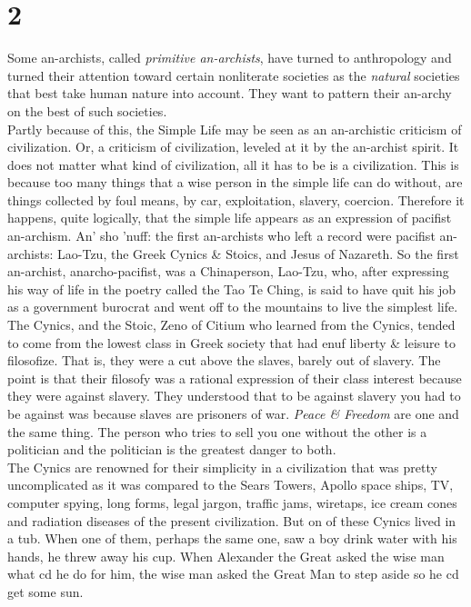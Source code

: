 \section*{2}
Some an-archists, called \emph{primitive an-archists}, have turned to anthropology and turned their attention toward certain nonliterate societies as the \emph{natural} societies that best take human nature into account. They want to pattern their an-archy on the best of such societies.\\
Partly because of this, the Simple Life may be seen as an an-archistic criticism of civilization. Or, a criticism of civilization, leveled at it by the an-archist spirit. It does not matter what kind of civilization, all it has to be is a civilization. This is because too many things that a wise person in the simple life can do without, are things collected by foul means, by car, exploitation, slavery, coercion. Therefore it happens, quite logically, that the simple life appears as an expression of pacifist an-archism. An' sho 'nuff: the first an-archists who left a record were pacifist an-archists: Lao-Tzu, the Greek Cynics \& Stoics, and Jesus of Nazareth. So the first an-archist, anarcho-pacifist, was a Chinaperson, Lao-Tzu, who, after expressing his way of life in the poetry called the Tao Te Ching, is said to have quit his job as a government burocrat and went off to the mountains to live the simplest life.\\
The Cynics, and the Stoic, Zeno of Citium who learned from the Cynics, tended to come from the lowest class in Greek society that had enuf liberty \& leisure to filosofize. That is, they were a cut above the slaves, barely out of slavery. The point is that their filosofy was a rational expression of their class interest because they were against slavery. They understood that to be against slavery you had to be against was because slaves are prisoners of war. \emph{Peace \& Freedom} are one and the same thing. The person who tries to sell you one without the other is a politician and the politician is the greatest danger to both.\\
The Cynics are renowned for their simplicity in a civilization that was pretty uncomplicated as it was compared to the Sears Towers, Apollo space ships, TV, computer spying, long forms, legal jargon, traffic jams, wiretaps, ice cream cones and radiation diseases of the present civilization. But on of these Cynics lived in a tub. When one of them, perhaps the same one, saw a boy drink water with his hands, he threw away his cup. When Alexander the Great asked the wise man what cd he do for him, the wise man asked the Great Man to step aside so he cd get some sun.\\
